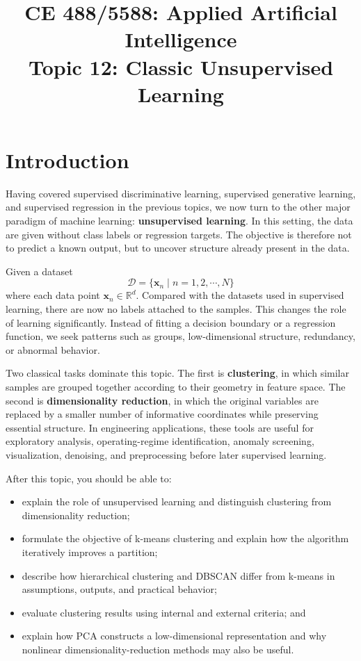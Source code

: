 \documentclass[12pt]{article}
\begin{document}
\doublespacing	

\title{CE 488/5588: Applied Artificial Intelligence\\ \large Topic 12: Classic Unsupervised Learning}
\author{}
\date{}
\maketitle

\section{Introduction}

Having covered supervised discriminative learning, supervised generative learning, and supervised regression in the previous topics, we now turn to the other major paradigm of machine learning: \textbf{unsupervised learning}. In this setting, the data are given without class labels or regression targets. The objective is therefore not to predict a known output, but to uncover structure already present in the data.

Given a dataset
\[
 \mathcal{D} = \{ \bm{x}_n \mid n = 1, 2, \cdots, N\}
\]
where each data point $\bm{x}_n\in \mathbb{R}^d$. Compared with the datasets used in supervised learning, there are now no labels attached to the samples. This changes the role of learning significantly. Instead of fitting a decision boundary or a regression function, we seek patterns such as groups, low-dimensional structure, redundancy, or abnormal behavior.

Two classical tasks dominate this topic. The first is \textbf{clustering}, in which similar samples are grouped together according to their geometry in feature space. The second is \textbf{dimensionality reduction}, in which the original variables are replaced by a smaller number of informative coordinates while preserving essential structure. In engineering applications, these tools are useful for exploratory analysis, operating-regime identification, anomaly screening, visualization, denoising, and preprocessing before later supervised learning.

After this topic, you should be able to:

\begin{itemize}
    \item explain the role of unsupervised learning and distinguish clustering from dimensionality reduction;
    \item formulate the objective of k-means clustering and explain how the algorithm iteratively improves a partition;
    \item describe how hierarchical clustering and DBSCAN differ from k-means in assumptions, outputs, and practical behavior;
    \item evaluate clustering results using internal and external criteria; and
    \item explain how PCA constructs a low-dimensional representation and why nonlinear dimensionality-reduction methods may also be useful.
\end{itemize}
\end{document}
